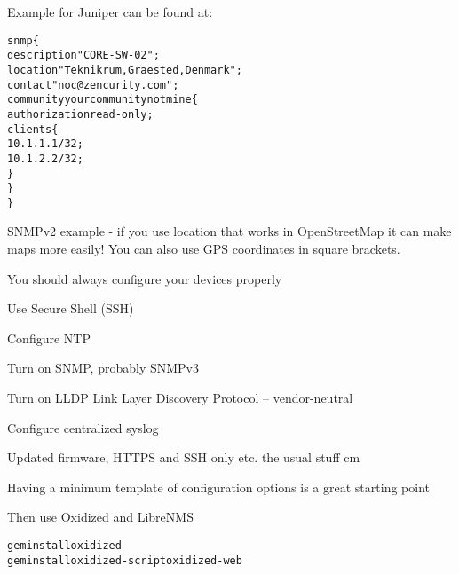 \documentclass[Screen16to9,17pt]{foils}
\begin{document}
Example for Juniper can be found at:\\
{\small{}}




\begin{alltt}
snmp \{
    description "CORE-SW-02";
    location "Teknikrum, Graested, Denmark";
    contact "noc@zencurity.com";
    community yourcommunitynotmine \{
        authorization read-only;
        clients \{
            10.1.1.1/32;
            10.1.2.2/32;
        \}
    \}
\}
\end{alltt}

SNMPv2 example - if you use location that works in OpenStreetMap it can make maps more easily! You can also use GPS coordinates in square brackets.







\begin{slidelist}
\item You should always configure your devices properly
\item Use Secure Shell (SSH)
\item Configure NTP
\item Turn on SNMP, probably SNMPv3
\item Turn on LLDP Link Layer Discovery Protocol -- vendor-neutral\\
{\small{}}
\item Configure centralized syslog
\item Updated firmware, HTTPS and SSH only etc. the usual stuff
 cm
\item Having a minimum template of configuration options is a great starting point
\end{slidelist}

Then use Oxidized and LibreNMS




\begin{alltt}
  gem install oxidized
  gem install oxidized-script oxidized-web
\end{alltt}
\end{document}
